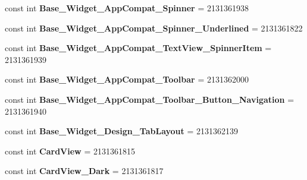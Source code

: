 \begin{DoxyCompactItemize}
const int {\bfseries Base\+\_\+\+Widget\+\_\+\+App\+Compat\+\_\+\+Spinner} = 2131361938
\item 
\mbox{\label{class_sample_app_1_1_droid_1_1_resource_1_1_style_ab4cbc8974bee250659bd195af75f6cd9}} 
const int {\bfseries Base\+\_\+\+Widget\+\_\+\+App\+Compat\+\_\+\+Spinner\+\_\+\+Underlined} = 2131361822
\item 
\mbox{\label{class_sample_app_1_1_droid_1_1_resource_1_1_style_a0840ee71d74058f484b8606e87f5688f}} 
const int {\bfseries Base\+\_\+\+Widget\+\_\+\+App\+Compat\+\_\+\+Text\+View\+\_\+\+Spinner\+Item} = 2131361939
\item 
\mbox{\label{class_sample_app_1_1_droid_1_1_resource_1_1_style_aa74e163fc681994831f64e54207263bf}} 
const int {\bfseries Base\+\_\+\+Widget\+\_\+\+App\+Compat\+\_\+\+Toolbar} = 2131362000
\item 
\mbox{\label{class_sample_app_1_1_droid_1_1_resource_1_1_style_a15ea3cda24f79d40fe74c925c6745d26}} 
const int {\bfseries Base\+\_\+\+Widget\+\_\+\+App\+Compat\+\_\+\+Toolbar\+\_\+\+Button\+\_\+\+Navigation} = 2131361940
\item 
\mbox{\label{class_sample_app_1_1_droid_1_1_resource_1_1_style_a359a7ee72ffa03e974d5923fa2289ffb}} 
const int {\bfseries Base\+\_\+\+Widget\+\_\+\+Design\+\_\+\+Tab\+Layout} = 2131362139
\item 
\mbox{\label{class_sample_app_1_1_droid_1_1_resource_1_1_style_aeaf314bfd7268a28efa0cc22fb6d75bf}} 
const int {\bfseries Card\+View} = 2131361815
\item 
\mbox{\label{class_sample_app_1_1_droid_1_1_resource_1_1_style_a99d3813cddcef2d3a3ac5228dacfc83a}} 
const int {\bfseries Card\+View\+\_\+\+Dark} = 2131361817
\item 
\mbox{\label{class_sample_app_1_1_droid_1_1_resource_1_1_style_ae1508d16eb70f9389a25c2f08fae76c3}} 

\end{DoxyCompactItemize}
